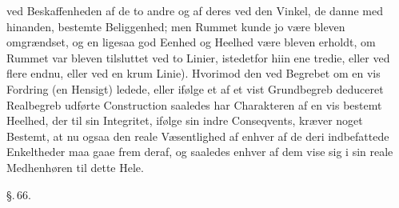 \documentclass[12pt]{book}
\def\textit#1{#1}%
\newcommand{\parag}[1]{%
  \par\vspace{0.9\baselineskip}%
  {\centering\textit{\S.\,#1.}\par}%
  \vspace{0.35\baselineskip}%
  \noindent\hspace{\parindent}\ignorespaces
}
\newcommand{\opage}[1]{\marginnote{\footnotesize\textit{[#1]}}}
\begin{document}
ved
\opage{175} Beskaffenheden af de to andre og af deres ved den Vinkel, de danne med
hinanden, bestemte Beliggenhed; men Rummet kunde jo være bleven omgrændset, og
en ligesaa god Eenhed og Heelhed være bleven erholdt, om Rummet var bleven
tilsluttet ved to Linier, istedetfor hiin ene tredie, eller ved flere endnu,
eller ved en krum Linie).
Hvorimod den ved Begrebet om en vis Fordring (en Hensigt) ledede, eller ifølge
et af et vist Grundbegreb deduceret Realbegreb udførte Construction saaledes
har Charakteren af en vis bestemt Heelhed, der til sin Integritet, ifølge sin
indre Conseqvents, kræver noget Bestemt, at nu ogsaa den reale Væsentlighed af
enhver af de deri indbefattede Enkeltheder maa gaae frem deraf, og saaledes
enhver af dem vise sig i sin reale Medhenhøren til dette Hele.

\parag{66}
\end{document}
